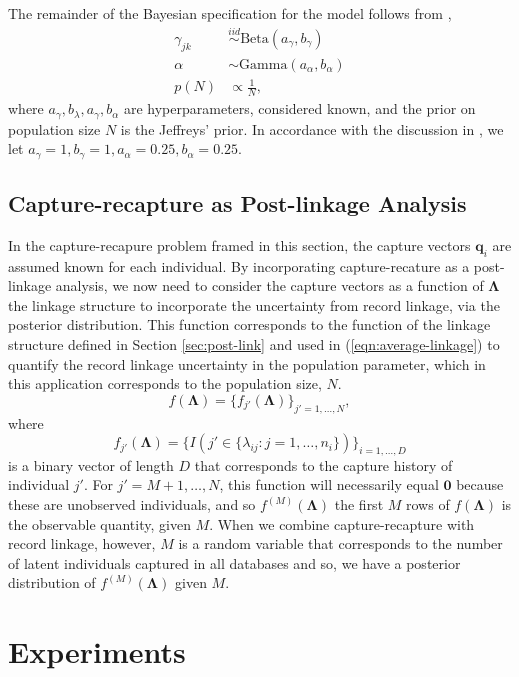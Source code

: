 \documentclass[11pt]{article}\usepackage[]{graphicx}\usepackage[]{color}
\begin{document}
The remainder of the Bayesian specification for the model follows from \citep{manrique2016bayesian},
\begin{align*}
\gamma_{jk} &\stackrel{iid}{\sim} \text{Beta}(a_\gamma, b_\gamma) \\
\alpha &\sim \text{Gamma}(a_\alpha, b_\alpha) \\
p(N) &\propto \frac{1}{N},
\end{align*}
where $a_\gamma, b_\lambda, a_\gamma, b_\alpha$ are hyperparameters, considered known, and the prior on population size $N$ is the Jeffreys' prior. In accordance with the discussion in \citep{manrique2016bayesian}, we let $a_\gamma = 1, b_\gamma = 1, a_\alpha = 0.25, b_\alpha = 0.25$.

\subsection{Capture-recapture as Post-linkage Analysis}
\label{sec:gen-post-link}

In the capture-recapure problem framed in this section, the capture vectors $\boldsymbol q_i$ are assumed known for each individual. By incorporating capture-recature as a post-linkage analysis, we now need to consider the capture vectors as a function of $\bm \Lambda$ the linkage structure to incorporate the uncertainty from record linkage, via the posterior distribution. This function corresponds to the function of the linkage structure defined in Section \ref{sec:post-link} and used in (\ref{eqn:average-linkage}) to quantify the record linkage uncertainty in the population parameter, which in this application corresponds to the population size, $N$.
$$
f(\bm \Lambda) = \{f_{j'}(\bm \Lambda)\}_{j' = 1, \dots, N},
$$
where
$$
f_{j'}(\bm \Lambda) = \{I(j' \in \{\lambda_{ij}:j = 1, \dots, n_i\})\}_{i = 1, \dots, D}
$$
is a binary vector of length $D$ that corresponds to the capture history of individual $j'$. For $j' = M + 1, \dots, N$, this function will necessarily equal $\boldsymbol 0$ because these are unobserved individuals, and so $f^{(M)}(\bm \Lambda)$ the first $M$ rows of $f(\bm \Lambda)$ is the observable quantity, given $M$. When we combine capture-recapture with record linkage, however, $M$ is a random variable that corresponds to the number of latent individuals captured in all databases and so, we have a posterior distribution of $f^{(M)}(\bm \Lambda)$ given $M$.


\section{Experiments}
\label{sec:experiments}
\end{document}
